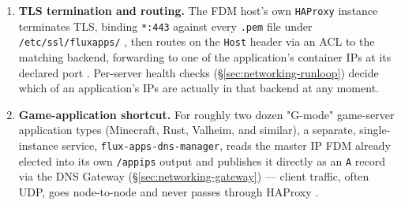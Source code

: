 \begin{enumerate}
{  true} — or by the self-hosted \PDNS zone service, selected per FDM host by
  \texttt{config.\allowbreak{}cloudflare.\allowbreak{}enabled}\slash\texttt{config.\allowbreak{}p\allowbreak{}DNS.\allowbreak{}enabled}
  . The evidence surveyed establishes how
  each backend behaves but not, from code alone, which one is authoritative for
  \texttt{runonflux.io} at any given moment: the checked-in default config is itself a
  certificate-only variant with \texttt{cloudflare.enabled:\ true}, and per-host Ansible
  templating can override this per fleet member .
  \item \textbf{TLS termination and routing.} The FDM host's own \texttt{HAProxy} instance
  terminates TLS, binding \texttt{*:443} against every \texttt{.pem} file under
  \texttt{/\allowbreak{}etc/\allowbreak{}ssl/\allowbreak{}fluxapps/\allowbreak{}} ,
  then routes on the \texttt{Host} header via an ACL to the matching backend, forwarding to one of
  the application's container IPs at its declared port
  . Per-server health
  checks (\S\ref{sec:networking-runloop}) decide which of an application's IPs are actually in that
  backend at any moment.
  \item \textbf{Game-application shortcut.} For roughly two dozen "G-mode" game-server application
  types (Minecraft, Rust, Valheim, and similar), a separate, single-instance service,
  \texttt{flux-\allowbreak{}apps-\allowbreak{}dns-\allowbreak{}manager}, reads the master IP FDM already elected into its own
  \texttt{/appips} output and publishes it directly as an \texttt{A} record via the DNS Gateway
  (\S\ref{sec:networking-gateway}) — client traffic, often UDP, goes node-to-node and never passes
  through HAProxy 
  .
\end{enumerate}

